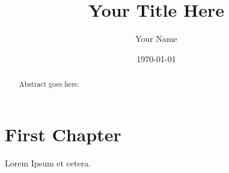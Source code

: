 \documentclass[english, oneside]{HYgradu}
\title{Your Title Here}
\author{Your Name}
\date{\today}
\begin{document}
\maketitle

\begin{abstract}
Abstract goes here.
\end{abstract}

\mytableofcontents

\chapter{First Chapter}

Lorem Ipsum et cetera.



%
%
\end{document}
